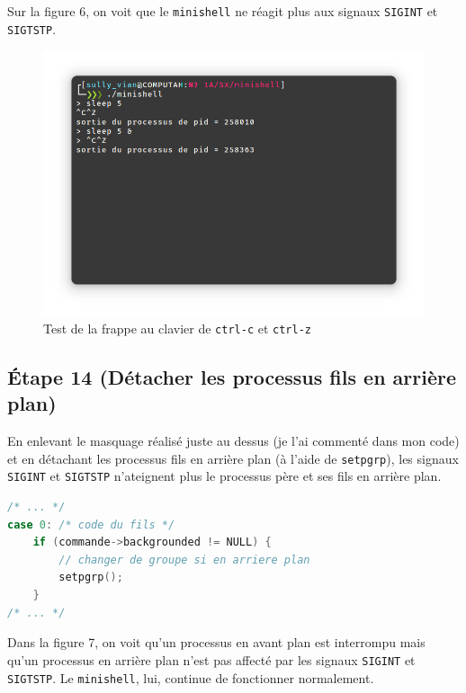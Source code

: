 \documentclass{article}
\begin{document}
Sur la figure 6, on voit que le \texttt{minishell} ne réagit plus aux signaux \texttt{SIGINT} et \texttt{SIGTSTP}.

\begin{figure}[H]
    \centering
    \includegraphics[width=\textwidth]{./resources/E13.3.png}
    \caption{Test de la frappe au clavier de \texttt{ctrl-c} et \texttt{ctrl-z}}
\end{figure}

\subsection*{Étape 14 (Détacher les processus fils en arrière plan)}

En enlevant le masquage réalisé juste au dessus (je l'ai commenté dans mon code) et en détachant les processus fils en arrière plan (à l'aide de \texttt{setpgrp}), les signaux \texttt{SIGINT} et \texttt{SIGTSTP} n'ateignent plus le processus père et ses fils en arrière plan.

\begin{lstlisting}[language=C, caption=ajout de la question 14]
/* ... */
case 0: /* code du fils */
    if (commande->backgrounded != NULL) {
        // changer de groupe si en arriere plan
        setpgrp();
    }
/* ... */
\end{lstlisting}

Dans la figure 7, on voit qu'un processus en avant plan est interrompu mais qu'un processus en arrière plan n'est pas affecté par les signaux \texttt{SIGINT} et \texttt{SIGTSTP}. Le \texttt{minishell}, lui, continue de fonctionner normalement.
\end{document}
